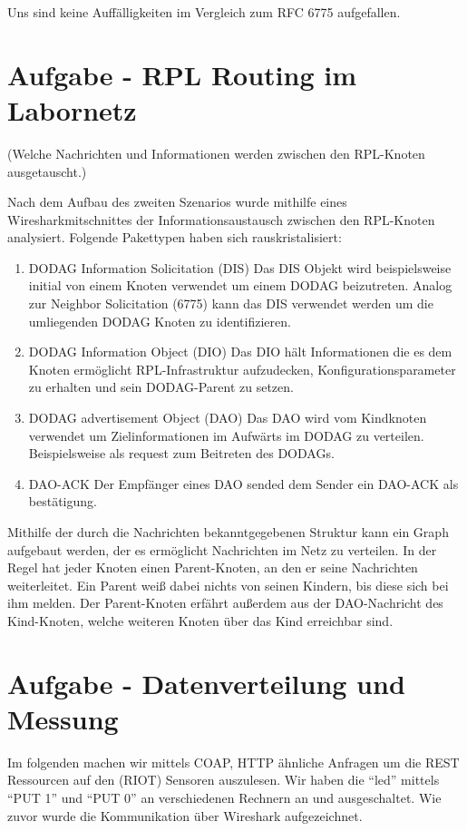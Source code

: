 \documentclass[paper=a4, fontsize=11pt]{scrartcl} %
\numberwithin{equation}{section} %
\numberwithin{figure}{section} %
\numberwithin{table}{section} %
\begin{document}
Uns sind keine Auffälligkeiten im Vergleich zum RFC 6775 aufgefallen.

\section{Aufgabe - RPL Routing im Labornetz}

(Welche Nachrichten und Informationen werden zwischen den RPL-Knoten ausgetauscht.)

Nach dem Aufbau des zweiten Szenarios wurde mithilfe eines Wiresharkmitschnittes der Informationsaustausch zwischen den RPL-Knoten analysiert. Folgende Pakettypen haben sich rauskristalisiert:
\begin{enumerate}
  \item DODAG Information Solicitation (DIS)
  Das DIS Objekt wird beispielsweise initial von einem Knoten verwendet um einem DODAG beizutreten. Analog zur Neighbor Solicitation (6775) kann das DIS verwendet werden um die umliegenden DODAG Knoten zu identifizieren.
  \item DODAG Information Object (DIO)
  Das DIO hält Informationen die es dem Knoten ermöglicht RPL-Infrastruktur aufzudecken, Konfigurationsparameter zu erhalten und sein DODAG-Parent zu setzen.
  \item DODAG advertisement Object (DAO)
  Das DAO wird vom Kindknoten verwendet um Zielinformationen im Aufwärts im DODAG zu verteilen. Beispielsweise als request zum Beitreten des DODAGs.
  \item DAO-ACK
  Der Empfänger eines DAO sended dem Sender ein DAO-ACK als bestätigung.
\end{enumerate}

Mithilfe der durch die Nachrichten bekanntgegebenen Struktur kann ein Graph aufgebaut werden, der es ermöglicht Nachrichten im Netz zu verteilen. In der Regel hat jeder Knoten einen Parent-Knoten, an den er seine Nachrichten weiterleitet. Ein Parent weiß dabei nichts von seinen Kindern, bis diese sich bei ihm melden. Der Parent-Knoten erfährt außerdem aus der DAO-Nachricht des Kind-Knoten, welche weiteren Knoten über das Kind erreichbar sind.

\section{Aufgabe - Datenverteilung und Messung}

Im folgenden machen wir mittels COAP, HTTP ähnliche Anfragen um die REST Ressourcen auf den (RIOT) Sensoren auszulesen. Wir haben die ``led'' mittels ``PUT 1'' und ``PUT 0'' an verschiedenen Rechnern an und ausgeschaltet. Wie zuvor wurde die Kommunikation über Wireshark aufgezeichnet.
\end{document}

